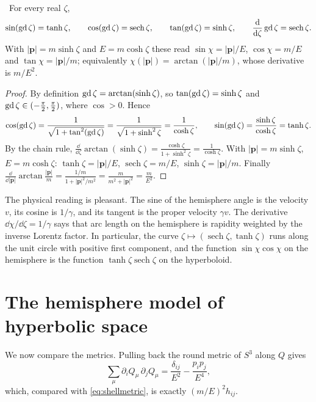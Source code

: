 \begin{theorem}\label{thm:gudermann}\ver\
For every real $\zeta$,
\[
\sin(\operatorname{gd}\zeta)=\tanh\zeta,\qquad\cos(\operatorname{gd}\zeta)=\operatorname{sech}\zeta,\qquad\tan(\operatorname{gd}\zeta)=\sinh\zeta,\qquad\frac{\mathrm{d}}{\mathrm{d}\zeta}\operatorname{gd}\zeta=\operatorname{sech}\zeta .
\]
With $|\mathbf p|=m\sinh\zeta$ and $E=m\cosh\zeta$ these read $\sin\chi=|\mathbf p|/E$, $\cos\chi=m/E$ and $\tan\chi=|\mathbf p|/m$; equivalently $\chi(|\mathbf p|)=\arctan(|\mathbf p|/m)$, whose derivative is $m/E^2$.
\end{theorem}
\begin{proof}
By definition $\operatorname{gd}\zeta=\arctan(\sinh\zeta)$, so $\tan(\operatorname{gd}\zeta)=\sinh\zeta$ and $\operatorname{gd}\zeta\in(-\frac\pi2,\frac\pi2)$, where $\cos>0$. Hence
\[
\cos(\operatorname{gd}\zeta)=\frac1{\sqrt{1+\tan^2(\operatorname{gd}\zeta)}}=\frac1{\sqrt{1+\sinh^2\zeta}}=\frac1{\cosh\zeta},\qquad \sin(\operatorname{gd}\zeta)=\frac{\sinh\zeta}{\cosh\zeta}=\tanh\zeta .
\]
By the chain rule, $\frac{\dd}{\dd\zeta}\arctan(\sinh\zeta)=\frac{\cosh\zeta}{1+\sinh^2\zeta}=\frac1{\cosh\zeta}$. With $|\mathbf p|=m\sinh\zeta$, $E=m\cosh\zeta$: $\tanh\zeta=|\mathbf p|/E$, $\operatorname{sech}\zeta=m/E$, $\sinh\zeta=|\mathbf p|/m$. Finally $\frac{\dd}{\dd|\mathbf p|}\arctan\frac{|\mathbf p|}m=\frac{1/m}{1+|\mathbf p|^2/m^2}=\frac m{m^2+|\mathbf p|^2}=\frac m{E^2}$.
\end{proof}


The physical reading is pleasant. The sine of the hemisphere angle is the velocity $v$, its cosine is $1/\gamma$, and its tangent is the proper velocity $\gamma v$. The derivative $\dd\chi/\dd\zeta=1/\gamma$ says that arc length on the hemisphere is rapidity weighted by the inverse Lorentz factor. In particular, the curve $\zeta\mapsto(\operatorname{sech}\zeta,\tanh\zeta)$ runs along the unit circle with positive first component, and the function $\sin\chi\cos\chi$ on the hemisphere is the function $\tanh\zeta\operatorname{sech}\zeta$ on the hyperboloid.

\section{The hemisphere model of hyperbolic space}

We now compare the metrics. Pulling back the round metric of $S^3$ along $Q$ gives
\begin{equation}\label{eq:pullback}
\sum_\mu\partial_iQ_\mu\,\partial_jQ_\mu=\frac{\delta_{ij}}{E^2}-\frac{p_ip_j}{E^4},
\end{equation}
which, compared with \eqref{eq:shellmetric}, is exactly $(m/E)^2h_{ij}$.

